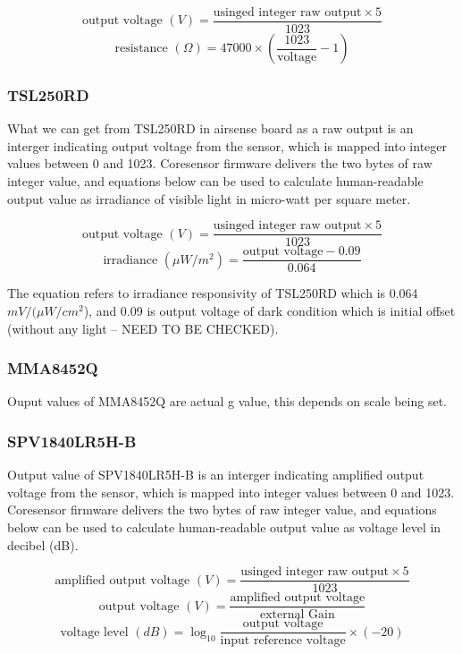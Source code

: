 {\centering
 \[ \text{output voltage } (V) = \frac{\text{usinged integer raw output} \times 5}{1023} \] 
 \[ \text{resistance } (\Omega) = 47000 \times \left(\frac{1023}{\text{voltage}} - 1\right) \]
 \par
 }


\subsubsection{ TSL250RD}

What we can get from TSL250RD in airsense board as a raw output is an interger indicating output voltage from the sensor, which is mapped into integer values between 0 and 1023. Coresensor firmware delivers the two bytes of raw integer value, and equations below can be used to calculate human-readable output value as irradiance of visible light in micro-watt per square meter.

{\centering
 \[ \text{output voltage }(V) = \frac{\text{usinged integer raw output} \times 5}{1023} \] 
 \[ \text{irradiance } (\mu W/m^2) = \frac{\text{output voltage} - 0.09}{0.064} \]
 \par
 }
 
\bigbreak
The equation refers to irradiance responsivity of TSL250RD which is 0.064 \(mV/(\mu W/cm^2\)), and 0.09 is output voltage of dark condition which is initial offset (without any light -- NEED TO BE CHECKED).

\subsubsection{ MMA8452Q}

Ouput values of MMA8452Q are actual g value, this depends on scale being set.

\subsubsection{ SPV1840LR5H-B}

Output value of SPV1840LR5H-B is an interger indicating amplified output voltage from the sensor, which is mapped into integer values between 0 and 1023. Coresensor firmware delivers the two bytes of raw integer value, and equations below can be used to calculate human-readable output value as voltage level in decibel (dB).

{\centering
 \[ \text{amplified output voltage }(V) = \frac{\text{usinged integer raw output} \times 5}{1023} \] 
 \[ \text{output voltage }(V) = \frac{\text{amplified output voltage}}{\text{external Gain}} \] 
 \[ \text{voltage level } (dB) = \log_{10} \frac{\text{output voltage}}{\text{input reference voltage}} \times (-20) \]
 \par
 }

